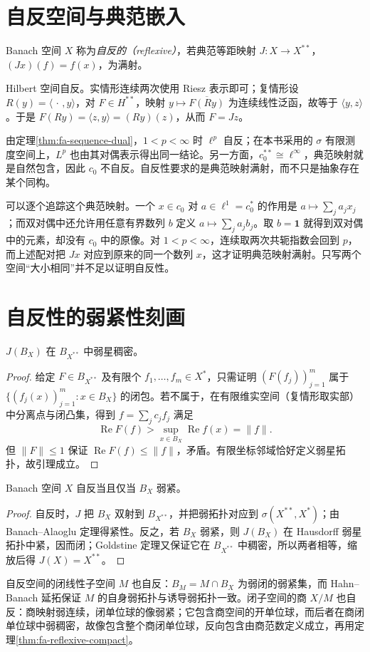 \section{自反空间与典范嵌入}
\begin{definition}
Banach 空间 $X$ 称为\emph{自反的（reflexive）}，若典范等距映射 $J:X\to X^{**}$，$(Jx)(f)=f(x)$，为满射。
\end{definition}
Hilbert 空间自反。实情形连续两次使用 Riesz 表示即可；复情形设 $R(y)=\langle\,\cdot\,,y\rangle$，对 $F\in H^{**}$，映射 $y\mapsto\overline{F(Ry)}$ 为连续线性泛函，故等于 $\langle y,z\rangle$。于是 $F(Ry)=\langle z,y\rangle=(Ry)(z)$，从而 $F=Jz$。

由定理\ref{thm:fa-sequence-dual}，$1<p<\infty$ 时 $\ell^p$ 自反；在本书采用的 $\sigma$ 有限测度空间上，$L^p$ 也由其对偶表示得出同一结论。另一方面，$c_0^{**}\cong\ell^\infty$，典范映射就是自然包含，因此 $c_0$ 不自反。自反性要求的是典范映射满射，而不只是抽象存在某个同构。

可以逐个追踪这个典范映射。一个 $x\in c_0$ 对 $a\in\ell^1=c_0^*$ 的作用是 $a\mapsto\sum_ja_jx_j$；而双对偶中还允许用任意有界数列 $b$ 定义 $a\mapsto\sum_ja_jb_j$。取 $b=\boldsymbol1$ 就得到双对偶中的元素，却没有 $c_0$ 中的原像。对 $1<p<\infty$，连续取两次共轭指数会回到 $p$，而上述配对把 $Jx$ 对应到原来的同一个数列 $x$，这才证明典范映射满射。只写两个空间“大小相同”并不足以证明自反性。

\section{自反性的弱紧性刻画}
\begin{lemma}[Goldstine 定理]\label{lem:fa-goldstine}
$J(B_X)$ 在 $B_{X^{**}}$ 中弱星稠密。
\end{lemma}
\begin{proof}
给定 $F\in B_{X^{**}}$ 及有限个 $f_1,\ldots,f_m\in X^*$，只需证明 $(F(f_j))_{j=1}^m$ 属于 $\{(f_j(x))_{j=1}^m:x\in B_X\}$ 的闭包。若不属于，在有限维实空间（复情形取实部）中分离点与闭凸集，得到 $f=\sum_jc_jf_j$ 满足
\[
 \operatorname{Re}F(f)>\sup_{x\in B_X}\operatorname{Re}f(x)=\|f\|.
\]
但 $\|F\|\leq1$ 保证 $\operatorname{Re}F(f)\leq\|f\|$，矛盾。有限坐标邻域恰好定义弱星拓扑，故引理成立。
\end{proof}
\begin{theorem}\label{thm:fa-reflexive-compact}
Banach 空间 $X$ 自反当且仅当 $B_X$ 弱紧。
\end{theorem}
\begin{proof}
自反时，$J$ 把 $B_X$ 双射到 $B_{X^{**}}$，并把弱拓扑对应到 $\sigma(X^{**},X^*)$；由 Banach--Alaoglu 定理得紧性。反之，若 $B_X$ 弱紧，则 $J(B_X)$ 在 Hausdorff 弱星拓扑中紧，因而闭；Goldstine 定理又保证它在 $B_{X^{**}}$ 中稠密，所以两者相等，缩放后得 $J(X)=X^{**}$。
\end{proof}
自反空间的闭线性子空间 $M$ 也自反：$B_M=M\cap B_X$ 为弱闭的弱紧集，而 Hahn--Banach 延拓保证 $M$ 的自身弱拓扑与诱导弱拓扑一致。闭子空间的商 $X/M$ 也自反：商映射弱连续，闭单位球的像弱紧；它包含商空间的开单位球，而后者在商闭单位球中弱稠密，故像包含整个商闭单位球，反向包含由商范数定义成立，再用定理\ref{thm:fa-reflexive-compact}。

